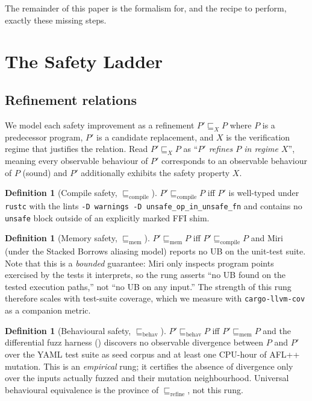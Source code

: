 \documentclass[12pt]{article}
\theoremstyle{definition}
\newtheorem{definition}[theorem]{Definition}
\theoremstyle{remark}
\begin{document}
The remainder of this paper is the formalism for, and the recipe to
perform, exactly these missing steps.

\section{The Safety Ladder}
\label{sec:ladder}

\subsection{Refinement relations}

We model each safety improvement as a refinement
$P' \sqsubseteq_X P$ where $P$ is a predecessor program, $P'$ is a
candidate replacement, and $X$ is the verification regime that justifies
the relation. Read $P' \sqsubseteq_X P$ as ``\emph{$P'$ refines $P$ in
regime $X$}'', meaning every observable behaviour of $P'$ corresponds to
an observable behaviour of $P$ (sound) and $P'$ additionally exhibits
the safety property $X$.

\begin{definition}[Compile safety, $\sqsubseteq_{\mathrm{compile}}$]
$P' \sqsubseteq_{\mathrm{compile}} P$ iff $P'$ is well-typed under
\texttt{rustc} with the lints \texttt{-D warnings -D unsafe\_op\_in\_unsafe\_fn}
and contains no \texttt{unsafe} block outside of an explicitly marked
FFI shim.
\end{definition}

\begin{definition}[Memory safety, $\sqsubseteq_{\mathrm{mem}}$]
$P' \sqsubseteq_{\mathrm{mem}} P$ iff
$P' \sqsubseteq_{\mathrm{compile}} P$ and Miri (under the Stacked
Borrows aliasing model) reports no UB on the unit-test suite. Note
that this is a \emph{bounded} guarantee: Miri only inspects program
points exercised by the tests it interprets, so the rung asserts ``no
UB found on the tested execution paths,'' not ``no UB on any input.''
The strength of this rung therefore scales with test-suite coverage,
which we measure with \texttt{cargo-llvm-cov} as a companion metric.
\end{definition}

\begin{definition}[Behavioural safety, $\sqsubseteq_{\mathrm{behav}}$]
$P' \sqsubseteq_{\mathrm{behav}} P$ iff
$P' \sqsubseteq_{\mathrm{mem}} P$ and the differential fuzz harness
() discovers no observable divergence between $P$ and
$P'$ over the YAML test suite as seed corpus and at least one CPU-hour
of AFL++ mutation. This is an \emph{empirical} rung; it certifies
the absence of divergence only over the inputs actually fuzzed and
their mutation neighbourhood. Universal behavioural equivalence is
the province of $\sqsubseteq_{\mathrm{refine}}$, not this rung.
\end{definition}
\end{document}
